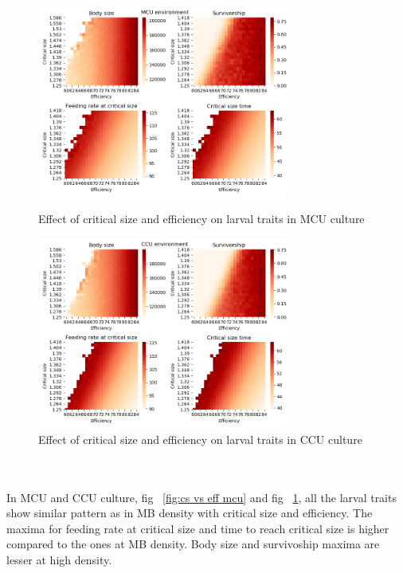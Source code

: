 \begin{figure}[!tbp]
  \centering
  \includegraphics[width=0.75\textwidth]{C3/Figs/Critical_size_vs_Efficiency_MCU}
  \caption{Effect of critical size and efficiency on larval traits in MCU culture}
  \label{fig:cs vs eff mcu}
  \vspace{24pt}
  \includegraphics[width=0.75\textwidth]{C3/Figs/Critical_size_vs_Efficiency_CCU}
  \caption{Effect of critical size and efficiency on larval traits in CCU culture}
  \label{fig:cs vs eff ccu}
\end{figure}\\\\
In MCU and CCU culture, fig ~\ref{fig:cs vs eff mcu} and fig ~\ref{fig:cs vs eff ccu}, all the larval traits show similar pattern as in MB density with critical size and efficiency. The maxima for feeding rate at critical size and time to reach critical size is higher compared to the ones at MB density. Body size and survivoship maxima are lesser at high density.
\pagebreak
